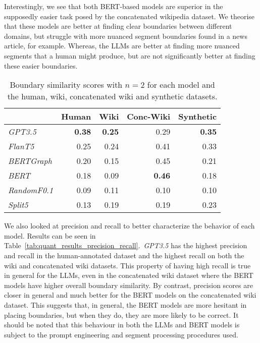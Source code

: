 Interestingly, we see that both BERT-based models are superior in the supposedly easier task posed by the concatenated wikipedia dataset. We theorise that these models are better at finding clear boundaries between different domains, but struggle with more nuanced segment boundaries found in a news article, for example. Whereas, the LLMs are better at finding more nuanced segments that a human might produce, but are not significantly better at finding these easier boundaries.

\begin{table}[ht]
    \centering
    \begin{tabular}{@{}lrrrr@{}}
    \toprule
    & Human & Wiki & Conc-Wiki & Synthetic \\ \midrule
    \it GPT3.5  & \bf 0.38 & \bf 0.25 & 0.29 & \bf 0.35 \\ 
    \it FlanT5  & 0.25 & 0.24 & 0.41 & 0.33 \\ 
    \midrule
    \it BERTGraph & 0.20 & 0.15 & 0.45 & 0.21 \\ 
    \it BERT & 0.18 & 0.09 & \bf 0.46 & 0.18 \\
    \it RandomF0.1& 0.09 & 0.11 & 0.10 & 0.10 \\
    \it Split5 & 0.13 & 0.19 & 0.19 & 0.23 \\
    \bottomrule
    \end{tabular}
    \caption{Boundary similarity scores with $n=2$ for each model and the human, wiki, concatenated wiki and synthetic datasets.}\label{tab:quant_results}
\end{table}

We also looked at precision and recall to better characterize the behavior of each model. Results can be seen in Table~\ref{tab:quant_results_precision_recall}.\ \emph{GPT3.5} has the highest precision and recall in the human-annotated dataset and the highest recall on both the wiki and concatenated wiki datasets. This property of having high recall is true in general for the LLMs, even in the concatenated wiki dataset where the BERT models have higher overall boundary similarity. By contrast, precision scores are closer in general and much better for the BERT models on the concatenated wiki dataset. This suggests that, in general, the BERT models are more hesitant in placing boundaries, but when they do, they are more likely to be correct. It should be noted that this behaviour in both the LLMs and BERT models is subject to the prompt engineering and segment processing procedures used.

